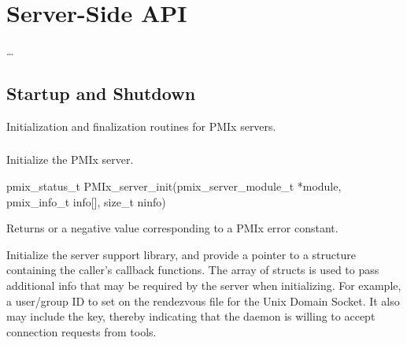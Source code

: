 \chapter{Server-Side API}
\label{chap:api_server}

\ldots

\section{Startup and Shutdown}
\label{chap:api_server:startup}

Initialization and finalization routines for \ac{PMIx} servers.

\subsection{}

\summary

Initialize the PMIx server.

\format

\cspecificstart
\begin{codepar}
pmix_status_t PMIx_server_init(pmix_server_module_t *module,
                               pmix_info_t info[], size_t ninfo)
\end{codepar}
\cspecificend

\begin{arglist}
\end{arglist}

Returns  or a negative value corresponding to a PMIx error constant.

\descr

Initialize the server support library, and provide a pointer to a  structure containing the caller's callback functions.
The array of  structs is used to pass additional info that may be required by the server when initializing.
For example, a user/group ID to set on the rendezvous file for the Unix Domain Socket.
It also may include the  key, thereby indicating that the daemon is willing to accept connection requests from tools.



